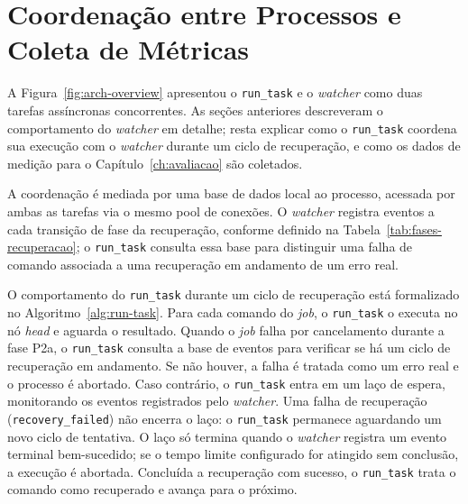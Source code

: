 \section{Coordenação entre Processos e Coleta de Métricas}
\label{sec:metricas}

A Figura~\ref{fig:arch-overview} apresentou o \texttt{run\_task} e o \textit{watcher} como
duas tarefas assíncronas concorrentes. As seções anteriores
descreveram o comportamento do \textit{watcher} em detalhe; resta explicar como o
\texttt{run\_task} coordena sua execução com o \textit{watcher} durante um ciclo de recuperação,
e como os dados de medição para o Capítulo~\ref{ch:avaliacao} são coletados.

A coordenação é mediada por uma base de dados local ao processo, acessada por
ambas as tarefas via o mesmo pool de conexões. O \textit{watcher} registra eventos a cada
transição de fase da recuperação, conforme definido na Tabela~\ref{tab:fases-recuperacao};
o \texttt{run\_task} consulta essa base para distinguir uma falha de comando associada
a uma recuperação em andamento de um erro real.

O comportamento do \texttt{run\_task} durante um ciclo de recuperação está formalizado
no Algoritmo~\ref{alg:run-task}. Para cada comando do \textit{job}, o \texttt{run\_task} o
executa no nó \textit{head} e aguarda o resultado.
Quando o \textit{job} falha por cancelamento durante a fase P2a, o \texttt{run\_task} consulta
a base de eventos para verificar se há um ciclo de recuperação em andamento.
Se não houver, a falha é tratada como um erro real e o processo é abortado. Caso contrário,
o \texttt{run\_task} entra em um laço de espera, monitorando os eventos registrados pelo \textit{watcher}.
Uma falha de recuperação (\texttt{recovery\_failed}) não encerra o laço: o \texttt{run\_task}
permanece aguardando um novo ciclo de tentativa. O laço só termina quando o \textit{watcher} registra um
evento terminal bem-sucedido; se o tempo limite configurado for atingido sem conclusão,
a execução é abortada. Concluída a recuperação com sucesso, o \texttt{run\_task} trata o comando
como recuperado e avança para o próximo.


